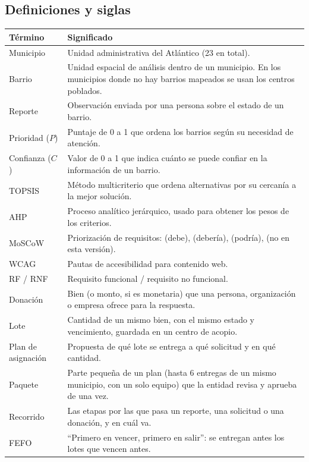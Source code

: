 \subsection{Definiciones y siglas}
\begin{tabularx}{\textwidth}{@{}lX@{}}
\toprule
\textbf{Término} & \textbf{Significado} \\
\midrule
Municipio & Unidad administrativa del Atlántico (23 en total). \\
Barrio & Unidad espacial de análisis dentro de un municipio. En los municipios donde no hay barrios mapeados se usan los centros poblados. \\
Reporte & Observación enviada por una persona sobre el estado de un barrio. \\
Prioridad ($P$) & Puntaje de 0 a 1 que ordena los barrios según su necesidad de atención. \\
Confianza ($C$) & Valor de 0 a 1 que indica cuánto se puede confiar en la información de un barrio. \\
TOPSIS & Método multicriterio que ordena alternativas por su cercanía a la mejor solución. \\
AHP & Proceso analítico jerárquico, usado para obtener los pesos de los criterios. \\
MoSCoW & Priorización de requisitos: \Must{} (debe), \Should{} (debería), \Could{} (podría), \Wont{} (no en esta versión). \\
WCAG & Pautas de accesibilidad para contenido web. \\
RF / RNF & Requisito funcional / requisito no funcional. \\
Donación & Bien (o monto, si es monetaria) que una persona, organización o empresa ofrece para la respuesta. \\
Lote & Cantidad de un mismo bien, con el mismo estado y vencimiento, guardada en un centro de acopio. \\
Plan de asignación & Propuesta de qué lote se entrega a qué solicitud y en qué cantidad. \\
Paquete & Parte pequeña de un plan (hasta 6 entregas de un mismo municipio, con un solo equipo) que la entidad revisa y aprueba de una vez. \\
Recorrido & Las etapas por las que pasa un reporte, una solicitud o una donación, y en cuál va. \\
FEFO & ``Primero en vencer, primero en salir'': se entregan antes los lotes que vencen antes. \\
\bottomrule
\end{tabularx}
